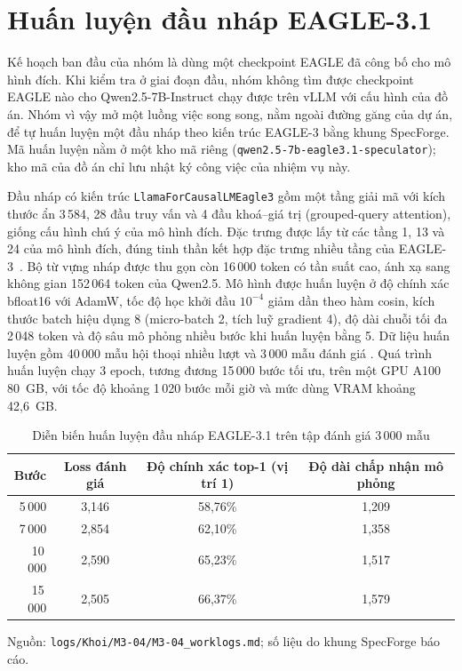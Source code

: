 \section{Huấn luyện đầu nháp EAGLE-3.1}
\label{sec:huan-luyen}

Kế hoạch ban đầu của nhóm là dùng một checkpoint EAGLE đã công bố cho mô hình đích. Khi kiểm tra ở giai đoạn đầu, nhóm không tìm được checkpoint EAGLE nào cho Qwen2.5-7B-Instruct chạy được trên vLLM với cấu hình của đồ án. Nhóm vì vậy mở một luồng việc song song, nằm ngoài đường găng của dự án, để tự huấn luyện một đầu nháp theo kiến trúc EAGLE-3 bằng khung SpecForge. Mã huấn luyện nằm ở một kho mã riêng (\texttt{qwen2.5-7b-eagle3.1-speculator}); kho mã của đồ án chỉ lưu nhật ký công việc của nhiệm vụ này.

Đầu nháp có kiến trúc \texttt{LlamaForCausalLMEagle3} gồm một tầng giải mã với kích thước ẩn 3\,584, 28 đầu truy vấn và 4 đầu khoá--giá trị (grouped-query attention), giống cấu hình chú ý của mô hình đích. Đặc trưng được lấy từ các tầng 1, 13 và 24 của mô hình đích, đúng tinh thần kết hợp đặc trưng nhiều tầng của EAGLE-3~\cite{li2025eagle3}. Bộ từ vựng nháp được thu gọn còn 16\,000 token có tần suất cao, ánh xạ sang không gian 152\,064 token của Qwen2.5. Mô hình được huấn luyện ở độ chính xác bfloat16 với AdamW, tốc độ học khởi đầu $10^{-4}$ giảm dần theo hàm cosin, kích thước batch hiệu dụng 8 (micro-batch 2, tích luỹ gradient 4), độ dài chuỗi tối đa 2\,048 token và độ sâu mô phỏng nhiều bước khi huấn luyện bằng 5. Dữ liệu huấn luyện gồm 40\,000 mẫu hội thoại nhiều lượt và 3\,000 mẫu đánh giá . Quá trình huấn luyện chạy 3 epoch, tương đương 15\,000 bước tối ưu, trên một GPU A100 80~GB, với tốc độ khoảng 1\,020 bước mỗi giờ và mức dùng VRAM khoảng 42,6~GB.

\begin{table}[htbp]
\centering
\caption{Diễn biến huấn luyện đầu nháp EAGLE-3.1 trên tập đánh giá 3\,000 mẫu}
\label{tab:huan-luyen}
\small
\begin{tabular}{@{}rccc@{}}
\toprule
\textbf{Bước} & \textbf{Loss đánh giá} & \textbf{Độ chính xác top-1 (vị trí 1)} & \textbf{Độ dài chấp nhận mô phỏng} \\
\midrule
5\,000 & 3,146 & 58,76\% & 1,209 \\
7\,000 & 2,854 & 62,10\% & 1,358 \\
10\,000 & 2,590 & 65,23\% & 1,517 \\
15\,000 & 2,505 & 66,37\% & 1,579 \\
\bottomrule
\end{tabular}

\vspace{2pt}
{\footnotesize Nguồn: \texttt{logs/Khoi/M3-04/M3-04\_worklogs.md}; số liệu do khung SpecForge báo cáo.}
\end{table}

